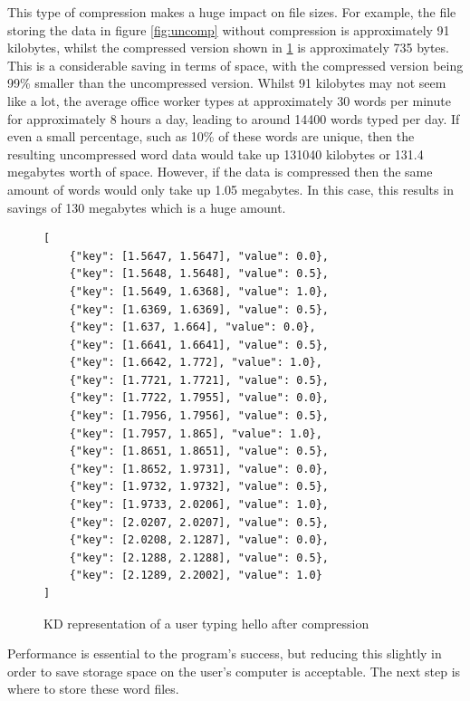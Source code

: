 \documentclass[10pt,a4paper]{report}
\begin{document}
This type of compression makes a huge impact on file sizes. For example, the file storing the data in figure \ref{fig:uncomp} without compression is approximately 91 kilobytes, whilst the compressed version shown in \ref{fig:compression} is approximately 735 bytes. This is a considerable saving in terms of space, with the compressed version being 99\% smaller than the uncompressed version. Whilst 91 kilobytes may not seem like a lot, the average office worker types at approximately 30 words per minute\cite{naskar_2020} for approximately 8 hours a day, leading to around 14400 words typed per day. If even a small percentage, such as 10\% of these words are unique, then the resulting uncompressed word data would take up 131040 kilobytes or 131.4 megabytes worth of space. However, if the data is compressed then the same amount of words would only take up 1.05 megabytes. In this case, this results in savings of 130 megabytes which is a huge amount.

\begin{figure}[h!]
	\begin{lstlisting}
[
    {"key": [1.5647, 1.5647], "value": 0.0}, 
    {"key": [1.5648, 1.5648], "value": 0.5}, 
    {"key": [1.5649, 1.6368], "value": 1.0}, 
    {"key": [1.6369, 1.6369], "value": 0.5},
    {"key": [1.637, 1.664], "value": 0.0}, 
    {"key": [1.6641, 1.6641], "value": 0.5}, 
    {"key": [1.6642, 1.772], "value": 1.0}, 
    {"key": [1.7721, 1.7721], "value": 0.5}, 
    {"key": [1.7722, 1.7955], "value": 0.0}, 
    {"key": [1.7956, 1.7956], "value": 0.5}, 
    {"key": [1.7957, 1.865], "value": 1.0},
    {"key": [1.8651, 1.8651], "value": 0.5}, 
    {"key": [1.8652, 1.9731], "value": 0.0}, 
    {"key": [1.9732, 1.9732], "value": 0.5}, 
    {"key": [1.9733, 2.0206], "value": 1.0}, 
    {"key": [2.0207, 2.0207], "value": 0.5}, 
    {"key": [2.0208, 2.1287], "value": 0.0}, 
    {"key": [2.1288, 2.1288], "value": 0.5}, 
    {"key": [2.1289, 2.2002], "value": 1.0}
]
	\end{lstlisting}
	\caption{KD representation of a user typing hello after compression}
	\label{fig:compression}
\end{figure}

Performance is essential to the program's success, but reducing this slightly in order to save storage space on the user's computer is acceptable. The next step is where to store these word files.
\end{document}
